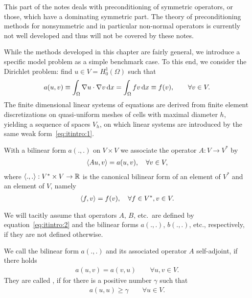 
\begin{remark}
  This part of the notes deals with preconditioning of symmetric
  operators, or those, which have a dominating symmetric part. The
  theory of preconditioning methods for nonsymmetric and in particular
  non-normal operators is currently not well developed and thus will not
  be covered by these notes. 
\end{remark}

\begin{example}
  While the methods developed in this chapter are fairly general, we
  introduce a specific model problem as a simple benchmark case. To
  this end, we consider the Dirichlet problem: find $u\in V =
  H^1_0(\Omega)$ such that
  \begin{gather}
    \label{eq:itintro:1}
    a(u,v) \equiv \int_\Omega \nabla u\cdot \nabla v \,\mathrm{d} x
    = \int_\Omega f v \,\mathrm{d} x \equiv f(v),
    \qquad \forall v\in V.
  \end{gather}
  The finite dimensional linear systems of equations are derived from
  finite element discretizations on quasi-uniform meshes of cells with
  maximal diameter $h$, yielding a sequence of spaces $V_h$, on which
  linear systems are introduced by the same weak
  form~\eqref{eq:itintro:1}.
\end{example}

\begin{notation}
  With a bilinear form $a(.,.)$ on $V\times V$ we associate the
  operator $A: V\to V^*$ by
  \begin{gather}
    \label{eq:itintro:2}
    \scal(Au,v) = a(u,v), \quad \forall v\in V,
  \end{gather}
  where $\scal(.,.):V^*\times V \to \R$ is the canonical bilinear form of an
  element of $V^*$ and an element of $V$, namely
  \begin{gather}
    \label{eq:richardson:9}
    \scal(f,v) = f(v), \quad \forall f\in V^*, v\in V.
  \end{gather}
  
  We will tacitly assume that operators $A$, $B$, etc.\ are defined by
  equation~\eqref{eq:itintro:2} and the bilinear forms $a(.,.)$,
  $b(.,.)$, etc., respectively, if they are not defined otherwise.
\end{notation}

\begin{definition}
  We call the bilinear form $a(.,.)$  and its
  associated operator $A$ self-adjoint, if there holds
  \begin{gather*}
    a(u,v) = a(v,u) \qquad \forall u,v \in V.
  \end{gather*}
  They are called , if for there is a positive number
  $\gamma$ such that
  \begin{gather*}
    a(u,u) \ge \gamma \qquad \forall u\in V.
  \end{gather*}
\end{definition}

